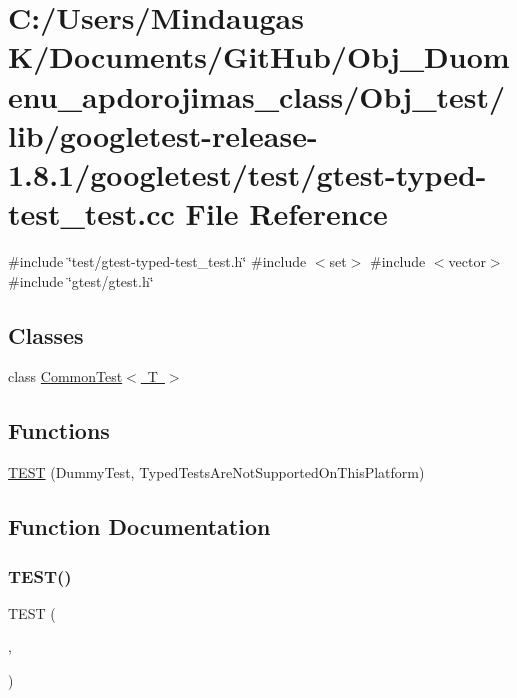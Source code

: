 \hypertarget{_obj__test_2lib_2googletest-release-1_88_81_2googletest_2test_2gtest-typed-test__test_8cc}{}\section{C\+:/\+Users/\+Mindaugas K/\+Documents/\+Git\+Hub/\+Obj\+\_\+\+Duomenu\+\_\+apdorojimas\+\_\+class/\+Obj\+\_\+test/lib/googletest-\/release-\/1.8.1/googletest/test/gtest-\/typed-\/test\+\_\+test.cc File Reference}
\label{_obj__test_2lib_2googletest-release-1_88_81_2googletest_2test_2gtest-typed-test__test_8cc}
{\ttfamily \#include \char`\"{}test/gtest-\/typed-\/test\+\_\+test.\+h\char`\"{}}\newline
{\ttfamily \#include $<$set$>$}\newline
{\ttfamily \#include $<$vector$>$}\newline
{\ttfamily \#include \char`\"{}gtest/gtest.\+h\char`\"{}}\newline
\subsection*{Classes}
\begin{DoxyCompactItemize}
\item 
class \mbox{\hyperlink{class_common_test}{Common\+Test$<$ T $>$}}
\end{DoxyCompactItemize}
\subsection*{Functions}
\begin{DoxyCompactItemize}
\item 
\mbox{\hyperlink{_obj__test_2lib_2googletest-release-1_88_81_2googletest_2test_2gtest-typed-test__test_8cc_a7d2c906b58ca05100fcea4e00858d2c6}{T\+E\+ST}} (Dummy\+Test, Typed\+Tests\+Are\+Not\+Supported\+On\+This\+Platform)
\end{DoxyCompactItemize}


\subsection{Function Documentation}
\mbox{\label{_obj__test_2lib_2googletest-release-1_88_81_2googletest_2test_2gtest-typed-test__test_8cc_a7d2c906b58ca05100fcea4e00858d2c6}} 
\subsubsection{\texorpdfstring{TEST()}{TEST()}}
{\footnotesize\ttfamily T\+E\+ST (\begin{DoxyParamCaption}\item[{Dummy\+Test}]{,  }\item[{Typed\+Tests\+Are\+Not\+Supported\+On\+This\+Platform}]{ }\end{DoxyParamCaption})}

